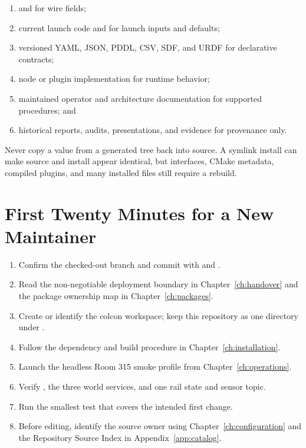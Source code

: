 \begin{enumerate}
  \item {} and
         for wire fields;
  \item current launch code and  for launch
        inputs and defaults;
  \item versioned YAML, JSON, PDDL, CSV, SDF, and URDF for declarative contracts;
  \item node or plugin implementation for runtime behavior;
  \item maintained operator and architecture documentation for supported
        procedures; and
  \item historical reports, audits, presentations, and evidence for provenance
        only.
\end{enumerate}

Never copy a value from a generated  tree back into source. A
symlink install can make source and install appear identical, but interfaces,
CMake metadata, compiled plugins, and many installed files still require a
rebuild.

\section{First Twenty Minutes for a New Maintainer}

\begin{procedurebox}
\begin{enumerate}
  \item Confirm the checked-out branch and commit with  and
        .
  \item Read the non-negotiable deployment boundary in
        Chapter~\ref{ch:handover} and the package ownership map in
        Chapter~\ref{ch:packages}.
  \item Create or identify the colcon workspace; keep this repository as one
        directory under .
  \item Follow the dependency and build procedure in
        Chapter~\ref{ch:installation}.
  \item Launch the headless Room 315 smoke profile from
        Chapter~\ref{ch:operations}.
  \item Verify , the three world services, and one rail state
        and sensor topic.
  \item Run the smallest test that covers the intended first change.
  \item Before editing, identify the source owner using
        Chapter~\ref{ch:configuration} and the Repository Source Index in
        Appendix~\ref{app:catalog}.
\end{enumerate}
\end{procedurebox}
